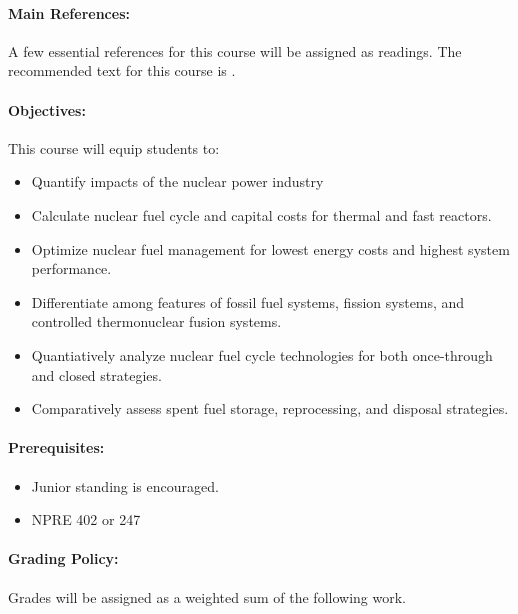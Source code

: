 \documentclass[11pt, a4paper]{article}
\begin{document}
\paragraph{Main References:}
A few essential references for this course will be assigned as readings. The 
recommended text for this course is \cite{tsoulfanidis_nuclear_2013}.

\renewcommand{\refname}{\normalfont\selectfont\normalsize}\vspace{-1cm} 


\paragraph{Objectives:} 

This course will equip students to:

\begin{itemize}
\item Quantify impacts of the nuclear power industry
\item Calculate nuclear fuel cycle and capital costs for thermal and fast reactors.
\item Optimize nuclear fuel management for lowest energy costs and highest system performance.
\item Differentiate among features of fossil fuel systems, fission systems, and controlled thermonuclear fusion systems.
\item Quantiatively analyze nuclear fuel cycle technologies for both once-through and closed strategies.
\item Comparatively assess spent fuel storage, reprocessing, and disposal strategies.
\end{itemize}

\paragraph{Prerequisites:} 
\begin{itemize}
\item Junior standing is encouraged.
\item NPRE 402 or 247
\end{itemize}

\paragraph{Grading Policy:} Grades will be assigned as a weighted sum of the 
following work.
\end{document}
